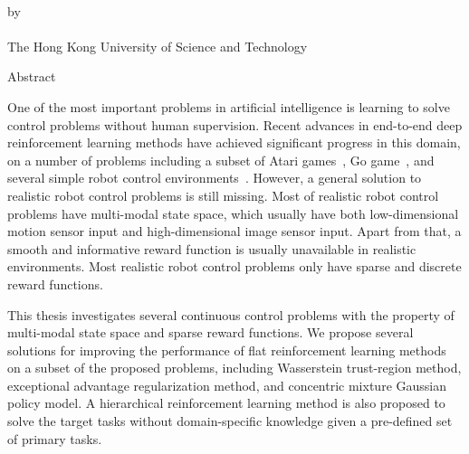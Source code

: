 \begin{center}
{\Large \thesistitle}\\
\vspace{20mm}
by \thesisauthor\\
\vspace{15mm}
\departmentname\\
\vspace{10mm}
The Hong Kong University of Science and Technology
\end{center}
\vspace{8mm}
\begin{center}
Abstract
\end{center}
One of the most important problems in artificial intelligence is learning to solve control problems without human supervision. Recent advances in end-to-end deep reinforcement learning methods have achieved significant progress in this domain, on a number of problems including a subset of Atari games~\cite{mnih2015human}, Go game~\cite{silver2016mastering}, and several simple robot control environments~\cite{duan2016benchmarking}.  However, a general solution to realistic robot control problems is still missing. Most of realistic robot control problems have multi-modal state space, which usually have both low-dimensional motion sensor input and high-dimensional image sensor input. Apart from that, a smooth and informative reward function is usually unavailable in realistic environments. Most realistic robot control problems only have sparse and discrete reward functions.

This thesis investigates several continuous control problems with the property of multi-modal state space and sparse reward functions. We propose several solutions for improving the performance of flat reinforcement learning methods on a subset of the proposed problems, including Wasserstein trust-region method, exceptional advantage regularization method, and concentric mixture Gaussian policy model. A hierarchical reinforcement learning method is also proposed to solve the target tasks without domain-specific knowledge given a pre-defined set of primary tasks. 

\par
\noindent


